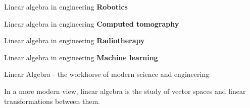 \documentclass[aspectratio=169]{beamer}
\begin{document}
\begin{frame}{Linear algebra in engineering}
  \textbf{Robotics}
  
\end{frame}


\begin{frame}{Linear algebra in engineering}
  \textbf{Computed tomography}
  
\end{frame}


\begin{frame}{Linear algebra in engineering}
  \textbf{Radiotherapy}
  
\end{frame}


\begin{frame}{Linear algebra in engineering}
  \textbf{Machine learning}
  
\end{frame}


\begin{frame}{Linear Algebra - the workhorse of modern science and engineering}

  In a more modern view, linear algebra is the study of vector spaces and linear transformations between them.
\end{frame}
\end{document}
